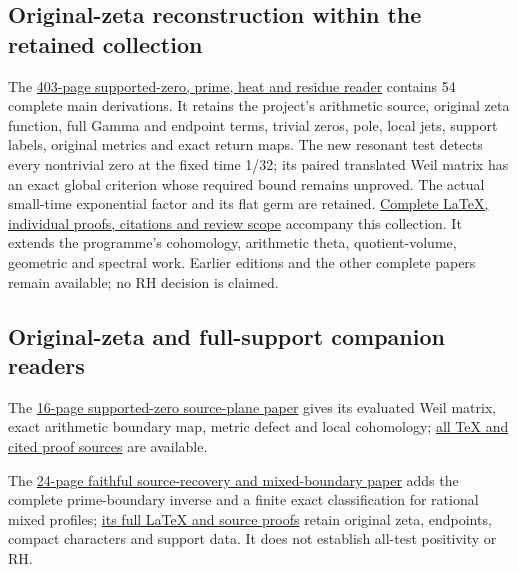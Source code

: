 \documentclass[
]{article}
\begin{document}
\subsection{Original-zeta reconstruction within the retained
collection}\label{original-zeta-reconstruction-within-the-retained-collection}

The
\href{https://github.com/KokunoYumeto/zeta-function-research-reader/blob/main/workbenches/splitzero-tandem/branches/tau-zero-prime-positivity/TAU_ZERO_PRIME_POSITIVITY.pdf}{403-page
supported-zero, prime, heat and residue reader} contains 54 complete
main derivations. It retains the project's arithmetic source, original
zeta function, full Gamma and endpoint terms, trivial zeros, pole, local
jets, support labels, original metrics and exact return maps. The new
resonant test detects every nontrivial zero at the fixed time 1/32; its
paired translated Weil matrix has an exact global criterion whose
required bound remains unproved. The actual small-time exponential
factor and its flat germ are retained.
\href{https://github.com/KokunoYumeto/zeta-function-research-reader/blob/main/workbenches/splitzero-tandem/branches/tau-zero-prime-positivity/PUBLICATION_COMPANION.md}{Complete
LaTeX, individual proofs, citations and review scope} accompany this
collection. It extends the programme's cohomology, arithmetic theta,
quotient-volume, geometric and spectral work. Earlier editions and the
other complete papers remain available; no RH decision is claimed.

\subsection{Original-zeta and full-support companion
readers}\label{original-zeta-and-full-support-companion-readers}

The
\href{https://github.com/KokunoYumeto/zeta-function-research-reader/blob/main/workbenches/splitzero-tandem/continuations/20260923-retained-source-readers/two-source-supported-zero/NOTE.pdf}{16-page
supported-zero source-plane paper} gives its evaluated Weil matrix,
exact arithmetic boundary map, metric defect and local cohomology;
\href{https://github.com/KokunoYumeto/zeta-function-research-reader/blob/main/workbenches/splitzero-tandem/continuations/20260923-retained-source-readers/two-source-supported-zero/PUBLICATION_READING.md}{all
TeX and cited proof sources} are available.

The
\href{https://github.com/KokunoYumeto/zeta-function-research-reader/blob/main/workbenches/splitzero-tandem/continuations/20260923-retained-source-readers/adelic-boundary-recovery/ADELIC_BOUNDARY_RECOVERY_READER.pdf}{24-page
faithful source-recovery and mixed-boundary paper} adds the complete
prime-boundary inverse and a finite exact classification for rational
mixed profiles;
\href{https://github.com/KokunoYumeto/zeta-function-research-reader/blob/main/workbenches/splitzero-tandem/continuations/20260923-retained-source-readers/adelic-boundary-recovery/ADELIC_BOUNDARY_RECOVERY_READER.tex}{its
full LaTeX and source proofs} retain original zeta, endpoints, compact
characters and support data. It does not establish all-test positivity
or RH.
\end{document}
